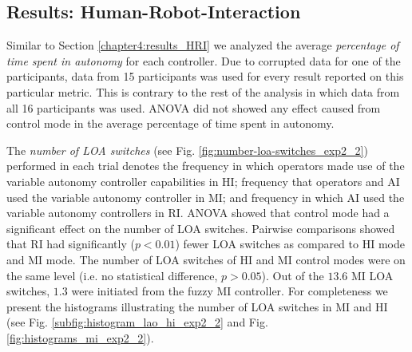 \documentclass[a4paper,12pt,oneside,openright]{bhamthesis}
\begin{document}
\subsection{Results: Human-Robot-Interaction}
\label{chapter5:sim_results_HRI}
Similar to Section \ref{chapter4:results_HRI} we analyzed the average \textit{percentage of time spent in autonomy} for each controller. Due to corrupted data for one of the participants, data from 15 participants was used for every result reported on this particular metric. This is contrary to the rest of the analysis in which data from all 16 participants was used. ANOVA did not showed any effect caused from control mode in the average percentage of time spent in autonomy.

The \textit{number of LOA switches} (see Fig. \ref{fig:number-loa-switches_exp2_2}) performed in each trial denotes the frequency in which operators made use of the variable autonomy controller capabilities in HI; frequency that operators and AI used the variable autonomy controller in MI; and frequency in which AI used the variable autonomy controllers in RI. ANOVA showed that control mode had a significant effect on the number of LOA switches. Pairwise comparisons showed that RI had significantly ($p < 0.01$) fewer LOA switches as compared to HI mode and MI mode. The number of LOA switches of HI and MI control modes were on the same level (i.e. no statistical difference, $p > 0.05$). Out of the $13.6$ MI LOA switches, $1.3$ were initiated from the fuzzy MI controller. For completeness we present the histograms illustrating the number of LOA switches in MI and HI (see Fig. \ref{subfig:histogram_lao_hi_exp2_2} and Fig. \ref{fig:histograms_mi_exp2_2}).
\end{document}

